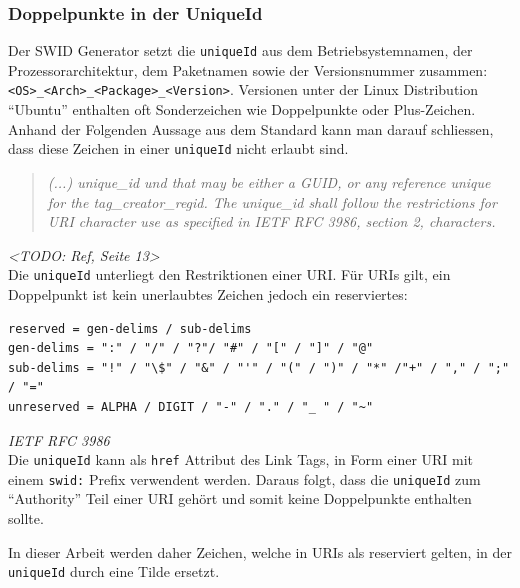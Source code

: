 \subsubsection{Doppelpunkte in der UniqueId} 
Der SWID Generator setzt die \texttt{uniqueId} aus dem Betriebsystemnamen, der
Prozessorarchitektur, dem Paketnamen sowie der Versionsnummer zusammen:
\texttt{<OS>\_<Arch>\_<Package>\_<Version>}. Versionen unter der Linux
Distribution \enquote{Ubuntu} enthalten oft Sonderzeichen wie Doppelpunkte oder
Plus-Zeichen. Anhand der Folgenden Aussage aus dem Standard kann man darauf
schliessen, dass diese Zeichen in einer \texttt{uniqueId} nicht erlaubt sind.

\begin{quote}
\textit{(...) unique\_id und that may be either a GUID, or any reference unique
for the tag\_creator\_regid. The unique\_id shall follow the restrictions for
URI character use as specified in IETF RFC 3986, section 2, characters.}
\end{quote} 
\textit{<TODO: Ref, Seite 13>}\\

Die \texttt{uniqueId} unterliegt den Restriktionen einer URI. Für URIs gilt, ein
Doppelpunkt ist kein unerlaubtes Zeichen jedoch ein reserviertes:

\begin{verbatim} 
reserved = gen-delims / sub-delims 
gen-delims = ":" / "/" / "?"/ "#" / "[" / "]" / "@" 
sub-delims = "!" / "\$" / "&" / "'" / "(" / ")" / "*" /"+" / "," / ";" / "=" 
unreserved = ALPHA / DIGIT / "-" / "." / "_ " / "~"
\end{verbatim}
\textit{IETF RFC 3986\cite{berners2005rfc}}\\

Die \texttt{uniqueId} kann als \texttt{href} Attribut des Link Tags, in Form
einer URI mit einem \texttt{swid:} Prefix verwendent werden. Daraus folgt, dass
die \texttt{uniqueId} zum \enquote{Authority} Teil einer URI gehört und somit
keine Doppelpunkte enthalten sollte.

In dieser Arbeit werden daher Zeichen, welche in URIs als reserviert gelten, in
der \texttt{uniqueId} durch eine Tilde ersetzt.
